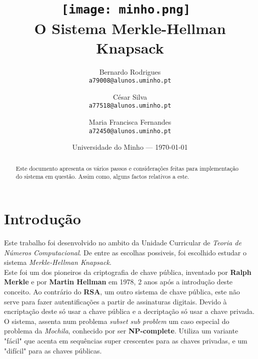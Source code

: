 \documentclass[11pt, language=portuguese]{report}
\begin{document}
\title{\texttt{[image: minho.png]}~\\[1cm] O Sistema Merkle-Hellman Knapsack}

\author{Bernardo Rodrigues\\ \texttt{a79008@alunos.uminho.pt}\\ \and César Silva\\ \texttt{a77518@alunos.uminho.pt}\\ \and Maria Francisca Fernandes\\ \texttt{a72450@alunos.uminho.pt}\\}

\date{Universidade do Minho --- \today}

\maketitle

\begin{abstract}

	Este documento apresenta os vários passos e considerações feitas para implementação do sistema em questão. Assim como, alguns factos relativos a este.


\end{abstract}

\tableofcontents

\listofalgorithms

\chapter{Introdução}

Este trabalho foi desenvolvido no ambito da Unidade Curricular de \textit{Teoria de Números Computacional}. De entre as escolhas possiveis, foi escolhido estudar o sistema \textit{Merkle-Hellman Knapsack}. \\
Este foi um dos pioneiros da criptografia de chave pública, inventado por \textbf{Ralph Merkle} e por \textbf{Martin Hellman} em 1978, 2 anos após a introdução deste conceito.
Ao contrário do \textbf{RSA}, um outro sistema de chave pública, este não serve para fazer autentificações a partir de assinaturas digitais. Devido à encriptação deste só usar a chave pública e a decriptação só usar a chave privada.
O sistema, assenta num problema \textit{subset sub problem} um caso especial do problema da \textit{Mochila}, conhecido por ser \textbf{NP-complete}. Utiliza um variante "fácil" que acenta em sequências super crescentes para as chaves privadas, e um "difícil" para as chaves públicas.
\end{document}
